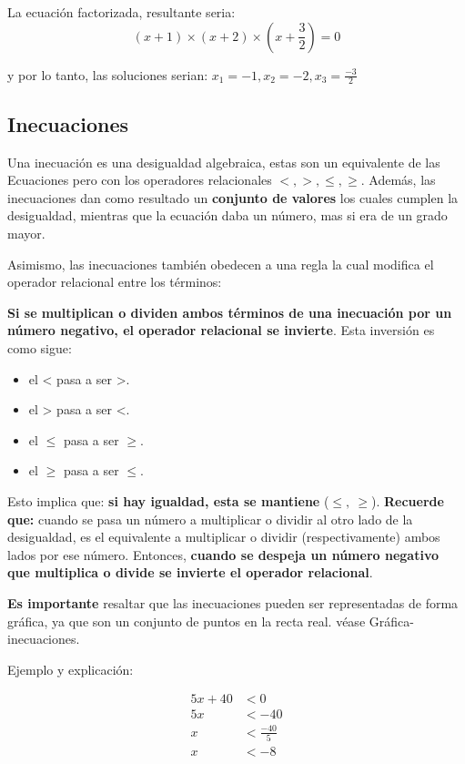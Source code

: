     La ecuación factorizada, resultante seria:
    $$ (x+1)\times(x+2)\times\left(x+\frac{3}{2}\right)= 0  $$

    y por lo tanto, las soluciones serian: $x_1 = -1, x_2 = -2, x_3=\frac{-3}{2} $

\subsection{Inecuaciones}

    Una inecuación es una desigualdad algebraica, estas son un equivalente de las
    Ecuaciones pero con los operadores relacionales $<,>,\leq,\geq$.
    Además, las inecuaciones dan como resultado un \textbf{conjunto de valores}
    los cuales cumplen la desigualdad, mientras que la ecuación daba un número,
    mas si era de un grado mayor.

    Asimismo, las inecuaciones también obedecen a una regla la cual modifica el
    operador relacional entre los términos:

    \textbf{Si se multiplican o dividen ambos términos de una inecuación por un
    número negativo, el operador relacional se invierte}. Esta inversión es como
    sigue:

    \begin{itemize}
        \item el < pasa a ser >.
        \item el > pasa a ser <.
        \item el $\leq$ pasa a ser $\geq$.
        \item el $\geq$ pasa a ser $\leq$.
    \end{itemize}

    Esto implica que: \textbf{si hay igualdad, esta se mantiene} ($\leq,\ \geq$).
    \textbf{Recuerde que:} cuando se pasa un número a multiplicar o dividir al
    otro lado de la desigualdad, es
    el equivalente a multiplicar o dividir (respectivamente) ambos lados por ese
    número. Entonces, \textbf{cuando se despeja un número negativo que multiplica
    o divide se invierte el operador relacional}.

    \textbf{Es importante} resaltar que las inecuaciones pueden ser representadas
    de forma gráfica, ya que son un conjunto de puntos en la recta real. véase
    \refname{Gráfica-inecuaciones}.


    Ejemplo y explicación:

    \begin{align*}
        5x + 40 & < 0\\
        5x  & < -40\\
        x & < \frac{-40}{5} \\
        x & < -8 \\
    \end{align*}

